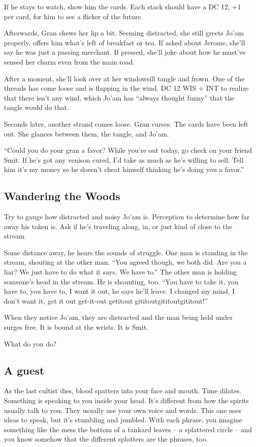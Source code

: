 \begin{multicols}{2}
If he stays to watch, show him the cards.
Each stack should have a DC 12, +1 per card, for him to see a flicker of the future.

Afterwards, Gran chews her lip a bit.
Seeming distracted, she still greets Jo'am  properly, offers him what's left of breakfast or tea.
If asked about Jerome, she'll say he was just a passing merchant.
If pressed, she'll joke about how he must've sensed her charm even from the main road.

After a moment, she'll look over at her windowsill tangle and frown.
One of the threads has come loose and is flapping in the wind.
DC 12 WIS + INT to realize that there isn't any wind, which Jo'am has ``always thought funny''
that the tangle would do that.

Seconds later, another strand comes loose.
Gran curses.
The cards have been left out.
She glances between them, the tangle, and Jo'am.

``Could you do your gran a favor?
While you're out today, go check on your friend Smit.
If he's got any venison cured, I'd take as much as he's willing to sell.
Tell him it's my money so he doesn't cheat himself thinking he's doing you a favor.''

\subsection{Wandering the Woods}

Try to gauge how distracted and noisy Jo'am is.
Perception to determine how far away his token is.
Ask if he's traveling along, in, or just kind of close to the stream.

Some distance away, he hears the sounds of struggle.
One man is standing in the stream, shouting at the other man.
``You agreed though, we both did.
  Are you a liar?
  We just have to do what it says.
  We have to.''
The other man is holding someone's head in the stream.
He is shounting, too.
``You have to take it, you have to, you have to, I want it out, he says he'll leave.
I changed my mind, I don't want it, get it out get-it-out getitout gititoutgititoutgititout!''

When they notice Jo'am, they are distracted and the man being held under surges free.
It is bound at the wrists.
It is Smit.

What do you do?

\subsection{A guest}
As the last cultist dies, blood spatters into your face and mouth.
Time dilates.
Something is speaking to you inside your head.
It's different from how the spirits usually talk to you.
They usually use your own voice and words.
This one uses ideas to speak, but it's stumbling and jumbled.
With each phrase, you imagine something like the mess the bottom of a tankard leaves --
  a splattered circle -- and you know somehow that the different splatters are the phrases, too.



\end{multicols}
